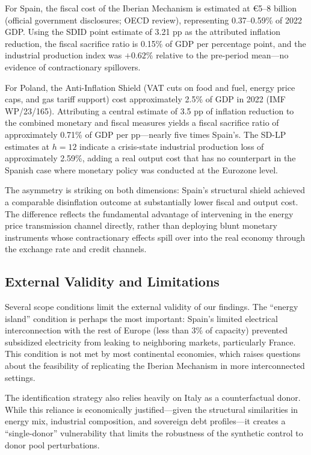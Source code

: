 \documentclass[12pt, a4paper]{article}
\begin{document}
For Spain, the fiscal cost of the Iberian Mechanism is estimated at \euro5--8 billion (official government disclosures; OECD review), representing 0.37--0.59\% of 2022 GDP. Using the SDID point estimate of 3.21 pp as the attributed inflation reduction, the fiscal sacrifice ratio is 0.15\% of GDP per percentage point, and the industrial production index was $+0.62\%$ relative to the pre-period mean---no evidence of contractionary spillovers.

For Poland, the Anti-Inflation Shield (VAT cuts on food and fuel, energy price caps, and gas tariff support) cost approximately 2.5\% of GDP in 2022 (IMF WP/23/165). Attributing a central estimate of 3.5 pp of inflation reduction to the combined monetary and fiscal measures yields a fiscal sacrifice ratio of approximately 0.71\% of GDP per pp---nearly five times Spain's. The SD-LP estimates at $h=12$ indicate a crisis-state industrial production loss of approximately 2.59\%, adding a real output cost that has no counterpart in the Spanish case where monetary policy was conducted at the Eurozone level.

The asymmetry is striking on both dimensions: Spain's structural shield achieved a comparable disinflation outcome at substantially lower fiscal and output cost. The difference reflects the fundamental advantage of intervening in the energy price transmission channel directly, rather than deploying blunt monetary instruments whose contractionary effects spill over into the real economy through the exchange rate and credit channels.


\subsection{External Validity and Limitations}

Several scope conditions limit the external validity of our findings. The ``energy island'' condition is perhaps the most important: Spain's limited electrical interconnection with the rest of Europe (less than 3\% of capacity) prevented subsidized electricity from leaking to neighboring markets, particularly France. This condition is not met by most continental economies, which raises questions about the feasibility of replicating the Iberian Mechanism in more interconnected settings.

The identification strategy also relies heavily on Italy as a counterfactual donor. While this reliance is economically justified---given the structural similarities in energy mix, industrial composition, and sovereign debt profiles---it creates a ``single-donor'' vulnerability that limits the robustness of the synthetic control to donor pool perturbations.
\end{document}
